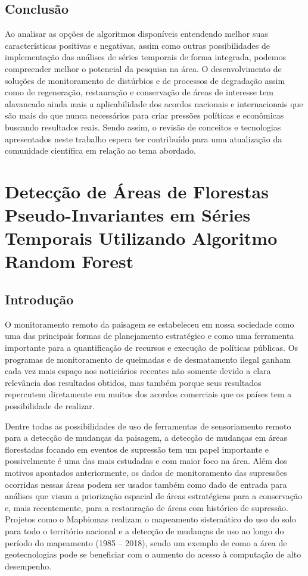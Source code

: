 \documentclass[12pt,a4paper]{article}
\begin{document}
\subsection{Conclusão}
\hspace{13pt} Ao analisar as opções de algoritmos disponíveis entendendo melhor suas características positivas e negativas, assim como outras possibilidades de implementação das análises de séries temporais de forma integrada, podemos compreender melhor o potencial da pesquisa na área. O desenvolvimento de soluções de monitoramento de distúrbios e de processos de degradação assim como de regeneração, restauração e conservação de áreas de interesse tem alavancado ainda mais a aplicabilidade dos acordos nacionais e internacionais que são mais do que nunca necessários para criar pressões políticas e econômicas buscando resultados reais. Sendo assim, o revisão de conceitos e tecnologias apresentados neste trabalho espera ter contribuído para uma atualização da comunidade científica em relação ao tema abordado.

\newpage
\section{Detecção de Áreas de Florestas Pseudo-Invariantes em Séries Temporais Utilizando Algoritmo Random Forest}

\subsection{Introdução}

\hspace{13pt} O monitoramento remoto da paisagem se estabeleceu em nossa sociedade como uma das principais formas de planejamento estratégico e como uma ferramenta importante para a quantificação de recursos e execução de políticas públicas. Os programas de monitoramento de queimadas e de desmatamento ilegal ganham cada vez mais espaço nos noticiários recentes não somente devido a clara relevância dos resultados obtidos, mas também porque seus resultados repercutem diretamente em muitos dos acordos comerciais que os países tem a possibilidade de realizar. 

Dentre todas as possibilidades de uso de ferramentas de sensoriamento remoto para a detecção de mudanças da paisagem, a detecção de mudanças em áreas florestadas focando em eventos de supressão tem um papel importante e possivelmente é uma das mais estudadas e com maior foco na área. Além dos motivos apontados anteriormente, os dados de monitoramento das supressões ocorridas nessas áreas podem ser usados também como dado de entrada para análises que visam a priorização espacial de áreas estratégicas para a conservação e, mais recentemente, para a restauração de áreas com histórico de supressão. Projetos como o Mapbiomas \citep{Souza2019} realizam o mapeamento sistemático do uso do solo para todo o território nacional e a detecção de mudanças de uso ao longo do período do mapeamento (1985 – 2018), sendo um exemplo de como a área de geotecnologias pode se beneficiar com o aumento do acesso à computação de alto desempenho. 
\end{document}
